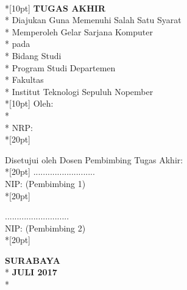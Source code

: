 \newpage
	\thispagestyle{plain}
	\begin{centering}
		\textbf{\MakeUppercase{\judul}} \\*[10pt]
		\textbf{\large{TUGAS AKHIR}} \\*
		Diajukan Guna Memenuhi Salah Satu Syarat \\*
		Memperoleh Gelar Sarjana Komputer \\*
		pada \\*
		Bidang Studi \bidangStudi \\*
		Program Studi \prodi Departemen \jurusan \\*
		Fakultas \fakultas \\*
		Institut Teknologi Sepuluh Nopember \\*[10pt]
		Oleh: \\*
		\textbf{\penulis} \\*
		NRP: \nrp \\*[20pt]
	\end{centering}

	{\noindent Disetujui oleh Dosen Pembimbing Tugas Akhir:}\\*[20pt]         \pembimbingSatu \hfill \hfill .......................... \\
		NIP: \nipPembimbingSatu \hfill \hfill (Pembimbing 1) \\*[20pt]
		
	{\noindent \pembimbingDua  \hfill \hfill ...........................}  \\
	NIP: \nipPembimbingDua \hfill \hfill (Pembimbing 2) \\*[20pt] 

	\begin{centering}
		\textbf{SURABAYA} \\*
		\textbf{JULI 2017} \\*
	\end{centering}
	\cleardoublepage
